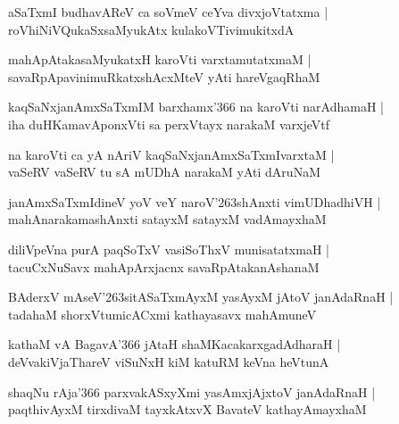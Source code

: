 \begin{shloka}
aSaTxmI budhavAReV ca soVmeV ceYva divxjoVtatxma |\\ 
roVhiNiVQukaSxsaMyukAtx kulakoVTivimukitxdA
\end{shloka}

\begin{shloka}
mahApAtakasaMyukatxH karoVti varxtamutatxmaM |\\
savaRpApavinimuRkatxshAcxMteV yAti hareVgaqRhaM
\end{shloka}

\begin{shloka}
kaqSaNxjanAmxSaTxmIM barxhamx\char'366 na karoVti narAdhamaH |\\
iha duHKamavAponxVti sa perxVtayx narakaM varxjeVtf
\end{shloka}

\begin{shloka}
na karoVti ca yA nAriV kaqSaNxjanAmxSaTxmIvarxtaM |\\
vaSeRV vaSeRV tu sA mUDhA narakaM yAti dAruNaM 
\end{shloka}

\begin{shloka}
janAmxSaTxmIdineV yoV veY naroV\char'263shAnxti vimUDhadhiVH |\\
mahAnarakamashAnxti satayxM satayxM vadAmayxhaM
\end{shloka}

\begin{shloka}
diliVpeVna purA paqSoTxV vasiSoThxV munisatatxmaH |\\
tacuCxNuSavx mahApArxjacnx savaRpAtakanAshanaM
\end{shloka}

\begin{shloka}
BAderxV mAseV\char'263sitASaTxmAyxM yasAyxM jAtoV janAdaRnaH |\\
tadahaM shorxVtumicACxmi kathayasavx mahAmuneV 
\end{shloka}

\begin{shloka}
kathaM vA BagavA\char'366 jAtaH shaMKacakarxgadAdharaH |\\
deVvakiVjaThareV viSuNxH kiM katuRM keVna heVtunA
\end{shloka}

\begin{shloka}
shaqNu rAja\char'366 parxvakASxyXmi yasAmxjAjxtoV janAdaRnaH |\\
paqthivAyxM tirxdivaM tayxkAtxvX BavateV kathayAmayxhaM
\end{shloka}

